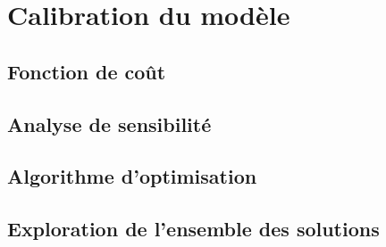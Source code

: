 \chapter{Calibration du modèle} 


\section{Fonction de coût}

\section{Analyse de sensibilité}

\section{Algorithme d'optimisation}

\section{Exploration de l'ensemble des solutions}
